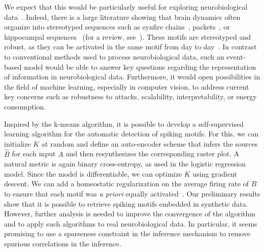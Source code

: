 \documentclass[runningheads]{llncs}
\newcommand{\kernel}{K} %
\begin{document}
We expect that this would be particularly useful for exploring neurobiological data~\cite{mackevicius_unsupervised_2019}. Indeed, there is a large literature showing that brain dynamics often organize into stereotyped sequences such as synfire chains~\cite{ikegaya_synfire_2004}, packets~\cite{luczak_sequential_2007}, or hippocampal sequences~\cite{pastalkova_internally_2008,villette_internally_2015} (for a review, see~\cite{grimaldi_precise_2022}). These motifs are stereotyped and robust, as they can be activated in the same motif from day to day~\cite{haimerl_internal_2019}. In contrast to conventional methods used to process neurobiological data, such an event-based model would be able to answer key questions regarding the representation of information in neurobiological data. Furthermore, it would open possibilities in the field of machine learning, especially in computer vision, to address current key concerns such as robustness to attacks, scalability, interpretability, or energy consumption.

Inspired by the k-means algorithm, it is possible to develop a self-supervised learning algorithm for the automatic detection of spiking motifs. For this, we can initialize $\kernel$ at random and define an auto-encoder scheme that infers the sources $\hat{B}$ for each input $A$ and then resynthesizes the corresponding raster plot. A natural metric is again binary cross-entropy, as used in the logistic regression model. Since the model is differentiable, we can optimize $\kernel$ using gradient descent. We can add a homeostatic regularization on the average firing rate of $B$ to ensure that each motif was \emph{a priori} equally activated~\cite{perrinet_adaptive_2019}. Our preliminary results show that it is possible to retrieve spiking motifs embedded in synthetic data. However, further analysis is needed to improve the convergence of the algorithm and to apply such algorithms to real neurobiological data. In particular, it seems promising to use a sparseness constraint in the inference mechanism to remove spurious correlations in the inference.
%


  
  
\end{document}

